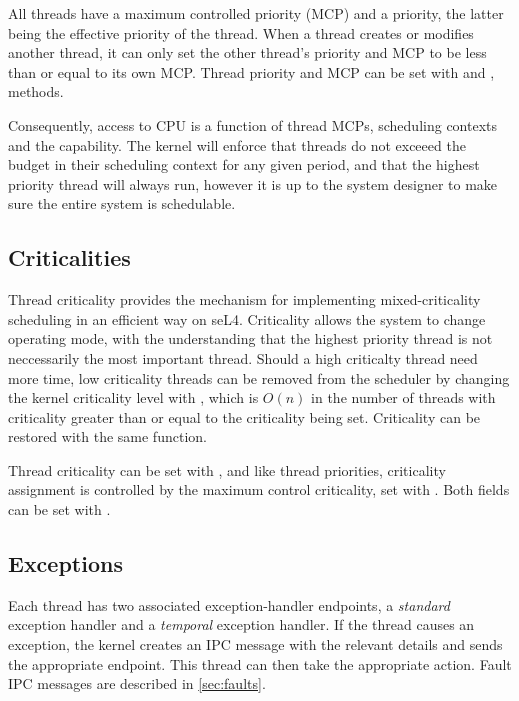 All threads have a maximum controlled priority (MCP) and a priority, the latter being the effective priority of the thread.
When a thread creates or modifies another thread, it can only set the
other thread's priority and MCP to be less than or equal to its own MCP. Thread priority and MCP can be
set with  and
,  methods.

Consequently, access to CPU is a function of thread MCPs, scheduling contexts and the  capability.
The kernel will enforce that threads do not exceeed the budget in their scheduling context for any given period, and that the highest priority thread will always run, however it is up to the system designer to make sure the entire system is schedulable.

\subsection{Criticalities}
\label{sec:criticality}

Thread criticality provides the mechanism for implementing mixed-criticality scheduling in an efficient way on seL4.
Criticality allows the system to change operating mode, with the understanding that the highest priority thread is not neccessarily the most important thread. 
Should a high criticalty thread need more time, low criticality threads can be removed from the scheduler by changing the kernel criticality level with , which is $O(n)$ in the number of threads with criticality greater than or equal to the criticality being set. 
Criticality can be restored with the same function. 

Thread criticality can be set with , and like thread priorities, criticality assignment is controlled by the maximum control criticality, set with . 
Both fields can be set with .

\subsection{Exceptions}
\label{sec:exceptions}

Each thread has two associated exception-handler endpoints, a \emph{standard} exception handler and a \emph{temporal} exception handler.
If the thread
causes an exception, the kernel creates an IPC message with the relevant
details and sends the appropriate endpoint. This
thread can then take the appropriate action. Fault IPC messages are
described in \autoref{sec:faults}.

